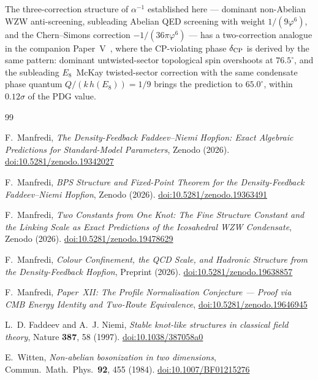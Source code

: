 \documentclass[11pt,a4paper]{article}
\theoremstyle{definition}
\theoremstyle{remark}
\newcommand{\vp}{\varphi}
\newcommand{\aInv}{\alpha^{-1}}
\begin{document}
The three-correction structure of $\aInv$ established here --- dominant
non-Abelian WZW anti-screening, subleading Abelian QED screening
with weight $1/(9\vp^6)$, and the Chern--Simons correction
$-1/(36\pi\vp^6)$ --- has a two-correction analogue in
the companion Paper~V~\cite{Paper5}, where the
CP-violating phase $\delta_{\rm CP}$ is derived by the same pattern:
dominant untwisted-sector topological spin overshoots at $76.5^\circ$,
and the subleading $E_8$~McKay twisted-sector correction with the same
condensate phase quantum $Q/(k\,h(E_8)) = 1/9$ brings the prediction to
$65.0^\circ$, within $0.12\sigma$ of the PDG value.

\begin{thebibliography}{99}

F.~Manfredi,
\textit{The Density-Feedback Faddeev--Niemi Hopfion:
  Exact Algebraic Predictions for Standard-Model Parameters},
Zenodo (2026).
\href{https://doi.org/10.5281/zenodo.19342027}{doi:10.5281/zenodo.19342027}

F.~Manfredi,
\textit{BPS Structure and Fixed-Point Theorem for the
  Density-Feedback Faddeev--Niemi Hopfion},
Zenodo (2026).
\href{https://doi.org/10.5281/zenodo.19363491}{doi:10.5281/zenodo.19363491}

F.~Manfredi,
\textit{Two Constants from One Knot: The Fine Structure Constant and
  the Linking Scale as Exact Predictions of the Icosahedral WZW Condensate},
Zenodo (2026).
\href{https://doi.org/10.5281/zenodo.19478629}{doi:10.5281/zenodo.19478629}

F.~Manfredi,
\textit{Colour Confinement, the QCD Scale, and Hadronic Structure
  from the Density-Feedback Hopfion},
Preprint (2026).
\href{https://doi.org/10.5281/zenodo.19638857}{doi:10.5281/zenodo.19638857}

F.~Manfredi,
\textit{Paper~XII: The Profile Normalisation Conjecture --- Proof via CMB Energy Identity and Two-Route Equivalence},
\href{https://doi.org/10.5281/zenodo.19646945}{doi:10.5281/zenodo.19646945}

L.~D. Faddeev and A.~J. Niemi,
\textit{Stable knot-like structures in classical field theory},
Nature \textbf{387}, 58 (1997).
\href{https://doi.org/10.1038/387058a0}{doi:10.1038/387058a0}

E.~Witten,
\textit{Non-abelian bosonization in two dimensions},
Commun.\ Math.\ Phys.\ \textbf{92}, 455 (1984).
\href{https://doi.org/10.1007/BF01215276}{doi:10.1007/BF01215276}


\end{thebibliography}
\end{document}
